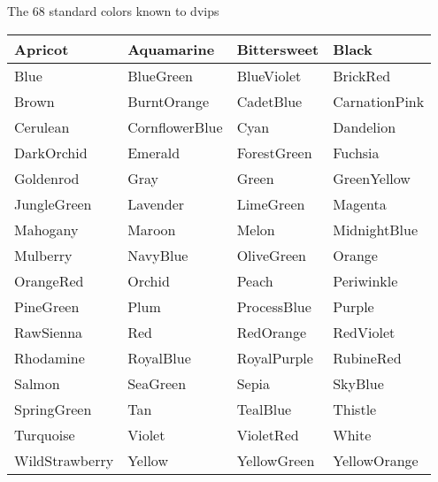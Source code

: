 \documentclass[11pt]{article}
\begin{document}
\begin{center}\large
The 68 standard colors known to dvips\vspace{0.5ex}
\begin{tabular}{|l|l|l|l|}
\hline
{\color{Apricot} Apricot}&
{\color{Aquamarine} Aquamarine}&
{\color{Bittersweet} Bittersweet}&
{\color{Black} Black}\\ \hline
{\color{Blue} Blue}&
{\color{BlueGreen} BlueGreen}&
{\color{BlueViolet} BlueViolet}&
{\color{BrickRed} BrickRed}\\  \hline
{\color{Brown} Brown}&
{\color{BurntOrange} BurntOrange}&
{\color{CadetBlue} CadetBlue}&
{\color{CarnationPink} CarnationPink}\\  \hline
{\color{Cerulean} Cerulean}&
{\color{CornflowerBlue} CornflowerBlue}&
{\color{Cyan} Cyan}&
{\color{Dandelion} Dandelion}\\  \hline
{\color{DarkOrchid} DarkOrchid}&
{\color{Emerald} Emerald}&
{\color{ForestGreen} ForestGreen}&
{\color{Fuchsia} Fuchsia}\\  \hline
{\color{Goldenrod} Goldenrod}&
{\color{Gray} Gray}&
{\color{Green} Green}&
{\color{GreenYellow} GreenYellow}\\  \hline
{\color{JungleGreen} JungleGreen}&
{\color{Lavender} Lavender}&
{\color{LimeGreen} LimeGreen}&
{\color{Magenta} Magenta}\\  \hline
{\color{Mahogany} Mahogany}&
{\color{Maroon} Maroon}&
{\color{Melon} Melon}&
{\color{MidnightBlue} MidnightBlue}\\  \hline
{\color{Mulberry} Mulberry}&
{\color{NavyBlue} NavyBlue}&
{\color{OliveGreen} OliveGreen}&
{\color{Orange} Orange}\\  \hline
{\color{OrangeRed} OrangeRed}&
{\color{Orchid} Orchid}&
{\color{Peach} Peach}&
{\color{Periwinkle} Periwinkle}\\  \hline
{\color{PineGreen} PineGreen}&
{\color{Plum} Plum}&
{\color{ProcessBlue} ProcessBlue}&
{\color{Purple} Purple}\\  \hline
{\color{RawSienna} RawSienna}&
{\color{Red} Red}&
{\color{RedOrange} RedOrange}&
{\color{RedViolet} RedViolet}\\  \hline
{\color{Rhodamine} Rhodamine}&
{\color{RoyalBlue} RoyalBlue}&
{\color{RoyalPurple} RoyalPurple}&
{\color{RubineRed} RubineRed}\\  \hline
{\color{Salmon} Salmon}&
{\color{SeaGreen} SeaGreen}&
{\color{Sepia} Sepia}&
{\color{SkyBlue} SkyBlue}\\  \hline
{\color{SpringGreen} SpringGreen}&
{\color{Tan} Tan}&
{\color{TealBlue} TealBlue}&
{\color{Thistle} Thistle}\\  \hline
{\color{Turquoise} Turquoise}&
{\color{Violet} Violet}&
{\color{VioletRed} VioletRed}&
{\color{White} White}\\  \hline
{\color{WildStrawberry} WildStrawberry}&
{\color{Yellow} Yellow}&
{\color{YellowGreen} YellowGreen}&
{\color{YellowOrange} YellowOrange}\\  \hline 
\end{tabular}
\end{center}
\end{document}
